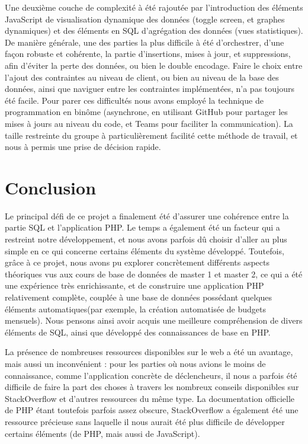 \documentclass[a4paper,12pt]{article}
\begin{document}
Une deuxième couche de complexité à été rajoutée par l'introduction des éléments JavaScript de visualisation dynamique des données (toggle screen, et graphes dynamiques) et des éléments en SQL d'agrégation des données (vues statistiques).
De manière générale, une des parties la plus difficile à été d'orchestrer, d'une façon robuste et cohérente, la partie d'insertions, mises à jour, et suppressions, afin d'éviter la perte des données, ou bien le double encodage.
Faire le choix entre l'ajout des contraintes au niveau de client, ou bien au niveau de la base des données, ainsi que naviguer entre les contraintes implémentées, n'a pas toujours été facile.
Pour parer ces difficultés nous avons employé la technique de programmation en binôme (asynchrone, en utilisant GitHub pour partager les mises à jours au niveau du code, et Teams pour faciliter la communication).
La taille restreinte du groupe à particulièrement facilité cette méthode de travail, et nous à permis une prise de décision rapide.

\newpage
\section{Conclusion}

Le principal défi de ce projet a finalement été d'assurer une cohérence entre la partie SQL et l'application PHP.
Le temps a également été un facteur qui a restreint notre développement, et nous avons parfois dû choisir d'aller au plus simple en ce qui concerne certains éléments du système développé.
Toutefois, grâce à ce projet, nous avons pu explorer concrètement différents aspects théoriques vus aux cours de base de données de master 1 et master 2, ce qui a été une expérience très enrichissante, et de construire une application PHP relativement complète, couplée à une base de données possédant quelques éléments \og automatiques\fg (par exemple, la création automatisée de budgets mensuels). Nous pensons ainsi avoir acquis une meilleure compréhension de divers éléments de SQL, ainsi que développé des connaissances de base en PHP.

La présence de nombreuses ressources disponibles sur le web a été un avantage, mais aussi un inconvénient : pour les parties où nous avions le moins de connaissance, comme l'application concrète de déclencheurs, il nous a parfois été difficile de faire la part des choses à travers les nombreux conseils disponibles sur StackOverflow et d'autres ressources du même type.
La documentation officielle de PHP étant toutefois parfois assez obscure, StackOverflow a également été une ressource précieuse sans laquelle il nous aurait été plus difficile de développer certains éléments (de PHP, mais aussi de JavaScript).
\end{document}
